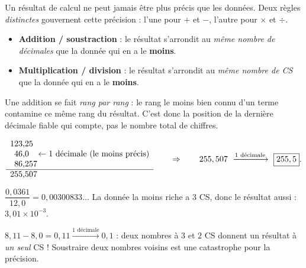 \documentclass[11pt,a4paper]{article}
\begin{document}

Un résultat de calcul ne peut jamais être plus précis que les données. Deux règles \emph{distinctes}
gouvernent cette précision : l'une pour $+$ et $-$, l'autre pour $\times$ et $\div$.

\begin{cle}
\begin{itemize}[leftmargin=1.6em,topsep=2pt,itemsep=2pt]
  \item \textbf{Addition / soustraction} : le résultat s'arrondit au \emph{même nombre de décimales} que
        la donnée qui en a le \textbf{moins}.
  \item \textbf{Multiplication / division} : le résultat s'arrondit au \emph{même nombre de CS} que la
        donnée qui en a le \textbf{moins}.
\end{itemize}
\end{cle}

\begin{methode}
Une addition se fait \emph{rang par rang} : le rang le moins bien connu d'un terme contamine ce même
rang du résultat. C'est donc la position de la dernière décimale fiable qui compte, pas le nombre total
de chiffres.
\end{methode}

\begin{exemplebox}
\[
\begin{array}{r@{}l}
  123{,}&25\\
   46{,}&0\phantom{0}\ \leftarrow \text{1 décimale (le moins précis)}\\
   86{,}&257\\
  \hline
  255{,}&507
\end{array}
\qquad\Rightarrow\qquad 255,507\ \xrightarrow{\text{1 décimale}}\ \boxed{255,5}.
\]
\end{exemplebox}

\begin{exemplebox}
$\dfrac{0,0361}{12,0}=0,00300833\ldots$ La donnée la moins riche a $3$ CS, donc le résultat aussi :
$\boxed{3,01\times10^{-3}}$.
\end{exemplebox}

\begin{piege}
$8,11-8,0=0,11\xrightarrow{\text{1 décimale}}0,1$ : deux nombres à $3$ et $2$ CS donnent un résultat à
\emph{un seul} CS ! Soustraire deux nombres voisins est une catastrophe pour la précision.
\end{piege}
\end{document}
